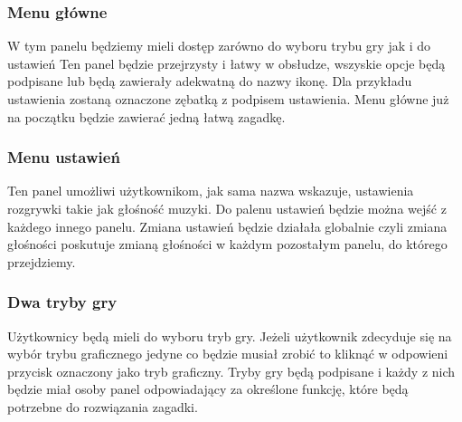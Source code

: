 \subsubsection{Menu główne}
W tym panelu będziemy mieli dostęp zarówno do wyboru trybu gry jak i do ustawień
Ten panel będzie przejrzysty i łatwy w obsłudze, wszyskie opcje będą podpisane lub będą zawierały adekwatną do nazwy ikonę. Dla przykładu ustawienia zostaną oznaczone zębatką z podpisem ustawienia. Menu główne już na początku będzie zawierać jedną łatwą zagadkę.

\subsubsection{Menu ustawień}
Ten panel umożliwi użytkownikom, jak sama nazwa wskazuje, ustawienia rozgrywki takie jak głośność muzyki. Do palenu ustawień będzie można wejść z każdego innego panelu. Zmiana ustawień będzie działała globalnie czyli zmiana głośności poskutuje zmianą głośności w każdym pozostałym panelu, do którego przejdziemy.

\subsubsection{Dwa tryby gry}
Użytkownicy będą mieli do wyboru tryb gry. Jeżeli użytkownik zdecyduje się na wybór trybu graficznego jedyne co będzie musiał zrobić to kliknąć w odpowieni przycisk oznaczony jako tryb graficzny. Tryby gry będą podpisane i każdy z nich będzie miał osoby panel odpowiadający za określone funkcję, które będą potrzebne do rozwiązania zagadki.